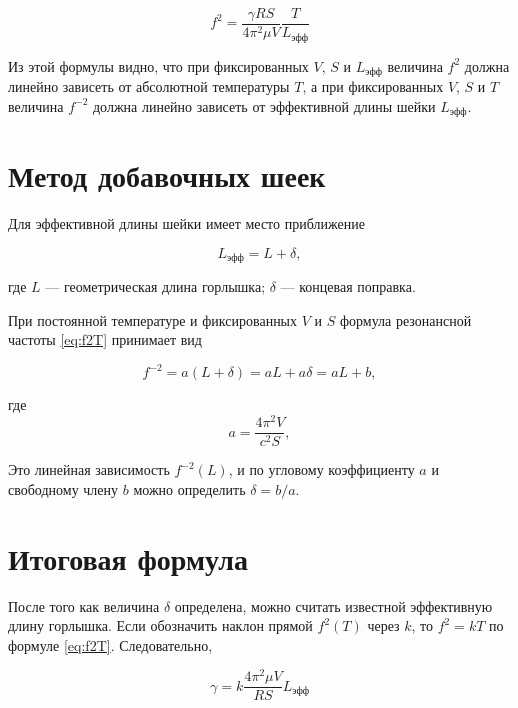 \documentclass[12pt]{extreport}
\begin{document}
	\begin{equation}
		f^2=\frac{\gamma RS}{4\pi^2 \mu V } \frac{T}{L_{\text{эфф}}}
		\label{eq:f2T}
	\end{equation}
	
	Из этой формулы видно, что при фиксированных \(V\), \(S\) и \(L_{\text{эфф}}\) величина \(f^2\) должна линейно зависеть от абсолютной температуры \(T\), а при фиксированных \(V\), \(S\) и \(T\) величина \(f^{-2}\) должна линейно зависеть от эффективной длины шейки \(L_{\text{эфф}}\).
	
	
	
	\section{Метод добавочных шеек}
	
	\hspace{4mm} Для эффективной длины шейки имеет место приближение
	
	\begin{equation}
		L_{\text{эфф}}=L+\delta,
		\label{eq:Leff}
	\end{equation}
	
	где \(L\) --- геометрическая длина горлышка; \(\delta\) --- концевая поправка.
	
	
	При постоянной температуре и фиксированных \(V\) и \(S\) формула резонансной частоты \eqref{eq:f2T} принимает вид

	\begin{equation}
		f^{-2} = a(L+\delta) = aL + a\delta = aL + b,
		\label{eq:invf2}
	\end{equation}
	
	где 
	\[
	a=\frac{4\pi^2V}{c^2S},
	\]
	
	Это линейная зависимость ${f^{-2}}(L)$, и по угловому коэффициенту $a$ и свободному члену $b$ можно определить $\delta = b/a$. 
	
	\section{Итоговая формула}
	
	\hspace{4mm} После того как величина \(\delta\) определена, можно считать известной эффективную длину горлышка. Если обозначить наклон прямой \(f^2(T)\) через \(k\), то $f^2=kT$ по формуле \eqref{eq:f2T}. Следовательно,
	
	\begin{equation}
		\gamma= k \frac{4\pi^2 \mu V }{RS}L_{\text{эфф}}
		\label{eq:gamma_prefinal}
	\end{equation}
	
\end{document}
